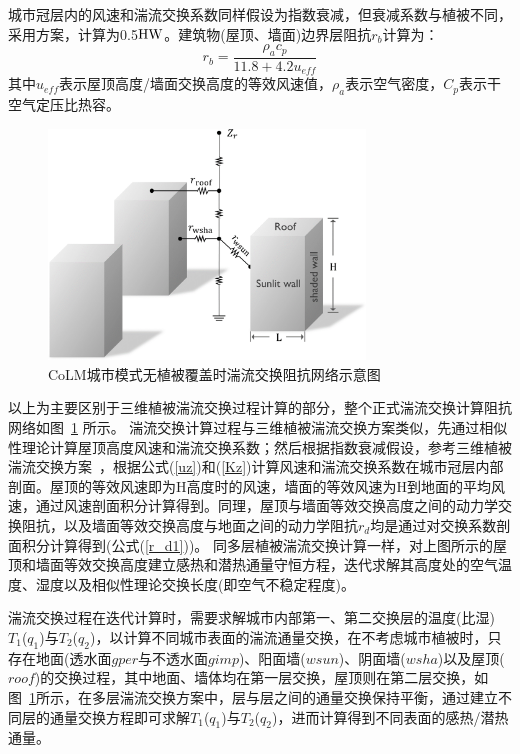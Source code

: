 城市冠层内的风速和湍流交换系数同样假设为指数衰减，但衰减系数与植被不同，
采用\citet{masson2000physically}方案，计算为0.5${\rm HW}$。建筑物(屋顶、墙面)边界层阻抗$r_b$计算为\citep{oleson2008urban}：
\begin{equation}
r_{b}=\frac{\rho_{a} c_{p}}{11.8+4.2 u_{e f f}}
\end{equation}
其中$u_{eff}$表示屋顶高度/墙面交换高度的等效风速值，$\rho_a$表示空气密度，$C_p$表示干空气定压比热容。

{
\begin{figure}[htbp]
\centering
\includegraphics[width=0.75\textwidth]{Figures/城市模式/CoLM城市模式无植被阻抗交换网络.png}
\caption{CoLM城市模式无植被覆盖时湍流交换阻抗网络示意图}
\label{fig:无植被覆盖时城市湍流交换阻抗示意图}
\end{figure}
}

以上为主要区别于三维植被湍流交换过程计算的部分，整个正式湍流交换计算阻抗网络如图~\ref{fig:无植被覆盖时城市湍流交换阻抗示意图} 所示。
湍流交换计算过程与三维植被湍流交换方案类似，先通过相似性理论计算屋顶高度风速和湍流交换系数；然后根据指数衰减假设，参考三维植被湍流交换方案~\citep{dai2019different}，根据公式(\ref{uz})和(\ref{Kz})计算风速和湍流交换系数在城市冠层内部剖面。屋顶的等效风速即为H高度时的风速，墙面的等效风速为H到地面的平均风速，通过风速剖面积分计算得到。同理，屋顶与墙面等效交换高度之间的动力学交换阻抗，以及墙面等效交换高度与地面之间的动力学阻抗$r_d$均是通过对交换系数剖面积分计算得到(公式(\ref{r_d1}))。
同多层植被湍流交换计算一样，对上图所示的屋顶和墙面等效交换高度建立感热和潜热通量守恒方程，迭代求解其高度处的空气温度、湿度以及相似性理论交换长度(即空气不稳定程度)。

湍流交换过程在迭代计算时，需要求解城市内部第一、第二交换层的温度(比湿) $T_1$($q_1$)与$T_2$($q_2$)，以计算不同城市表面的湍流通量交换，在不考虑城市植被时，只存在地面(透水面$gper$与不透水面$gimp$)、阳面墙($wsun$)、阴面墙($wsha$)以及屋顶($roof$)的交换过程，其中地面、墙体均在第一层交换，屋顶则在第二层交换，如图~\ref{fig:无植被覆盖时城市湍流交换阻抗示意图}所示，在多层湍流交换方案中，层与层之间的通量交换保持平衡，通过建立不同层的通量交换方程即可求解$T_1$($q_1$)与$T_2$($q_2$)，进而计算得到不同表面的感热/潜热通量。

